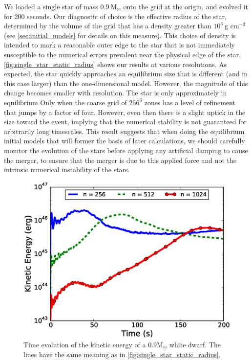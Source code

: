 \documentclass[iop]{../emulateapj}
\newcommand{\msolar}{\mathrm{M}_\odot}
\begin{document}
We loaded a single star of mass $0.9\ \msolar$ onto the grid at the origin, 
and evolved it for 200 seconds. Our diagnostic of choice is the effective 
radius of the star, determined by the volume of the grid that has a density 
greater than $10^3\ \text{g cm}^{-3}$ (see \autoref{sec:initial_models} 
for details on this measure). This choice of density is intended to 
mark a reasonable outer edge to the star that is not immediately susceptible 
to the numerical errors prevalent near the physical edge of the star. 
\autoref{fig:single_star_static_radius} shows our results at various resolutions. 
As expected, the star quickly approaches an equilibrium size that is different 
(and in this case larger) than the one-dimensional model. However, the magnitude 
of this change becomes smaller with resolution. The star is only approximately 
in equilibrium Only when the coarse grid of $256^3$ zones has a level of 
refinement that jumps by a factor of four. However, even then there is a slight 
uptick in the size toward the event, implying that the numerical stability 
is not guaranteed for arbitrarily long timescales. This result suggests that when 
doing the equilibrium initial models that will former the basis of later calculations,
we should carefully monitor the evolution of the stars before applying any 
artificial damping to cause the merger, to ensure that the merger is due to 
this applied force and not the intrinsic numerical instability of the stars.

\begin{figure}
  \centering
  \includegraphics[scale=0.45]{plots/single_star_static_ke}
  \caption{Time evolution of the kinetic energy of a $0.9 \msolar$ 
    white dwarf. The lines have the same meaning as in \autoref{fig:single_star_static_radius}.
    \label{fig:single_star_static_ke}}
\end{figure}
\end{document}
